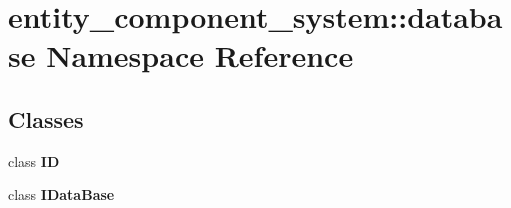 \section{entity\+\_\+component\+\_\+system\+:\+:database Namespace Reference}
\label{namespaceentity__component__system_1_1database}
\subsection*{Classes}
\begin{DoxyCompactItemize}
\item 
class {\bf ID}
\item 
class {\bf I\+Data\+Base}
\end{DoxyCompactItemize}
